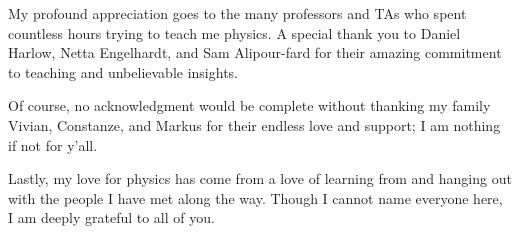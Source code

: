 \vspace{5mm}

My profound appreciation goes to the many professors and TAs who spent countless hours trying to teach me physics. A special thank you to Daniel Harlow, Netta Engelhardt, and Sam Alipour-fard for their amazing commitment to teaching and unbelievable insights. 

\vspace{5mm}

Of course, no acknowledgment would be complete without thanking my family Vivian, Constanze, and Markus for their endless love and support; I am nothing if not for y'all. 

\vspace{5mm}

Lastly, my love for physics has come from a love of learning from and hanging out with the people I have met along the way. Though I cannot name everyone here, I am deeply grateful to all of you.
